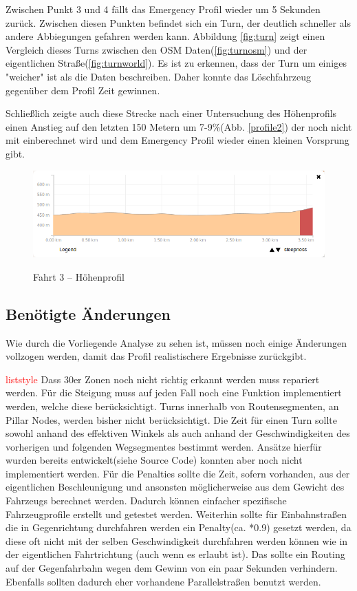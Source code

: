 \documentclass[12pt,a4paper]{article}
\newcommand\todo[1]{\textcolor{red}{#1}}
\begin{document}
Zwischen Punkt 3 und 4 fällt das Emergency Profil wieder um 5 Sekunden zurück. Zwischen diesen Punkten befindet sich ein Turn, der deutlich schneller als andere Abbiegungen gefahren werden kann. Abbildung \ref{fig:turn} zeigt einen Vergleich dieses Turns zwischen den OSM Daten(\ref{fig:turnosm}) und der eigentlichen Straße(\ref{fig:turnworld}). Es ist zu erkennen, dass der Turn um einiges "weicher" ist als die Daten beschreiben. Daher konnte das Löschfahrzeug gegenüber dem Profil Zeit gewinnen.

Schließlich zeigte auch diese Strecke nach einer Untersuchung des Höhenprofils einen Anstieg auf den letzten 150 Metern um 7-9\%(Abb. \ref{profile2}) der noch nicht mit einberechnet wird und dem Emergency Profil wieder einen kleinen Vorsprung gibt.

\begin{figure}[h]
\centering
\caption{Fahrt 3 -- Höhenprofil}
\label{fig:profile2}
\includegraphics[width = 0.60 \textwidth]{../media/Fahrt3_Profile.png} \\
\end{figure}


\subsection{Benötigte Änderungen}

Wie durch die Vorliegende Analyse zu sehen ist, müssen noch einige Änderungen vollzogen werden, damit das Profil realistischere Ergebnisse zurückgibt.\par
\todo{liststyle}
Dass 30er Zonen noch nicht richtig erkannt werden muss repariert werden.
Für die Steigung muss auf jeden Fall noch eine Funktion implementiert werden, welche diese berücksichtigt.
Turns innerhalb von Routensegmenten, an Pillar Nodes, werden bisher nicht berücksichtigt.
Die Zeit für einen Turn sollte sowohl anhand des effektiven Winkels als auch anhand der Geschwindigkeiten des vorherigen und folgenden Wegsegmentes bestimmt werden. Ansätze hierfür wurden bereits entwickelt(siehe Source Code) konnten aber noch nicht implementiert werden.
Für die Penalties sollte die Zeit, sofern vorhanden, aus der eigentlichen Beschleunigung und ansonsten möglicherweise aus dem Gewicht des Fahrzeugs berechnet werden. Dadurch können einfacher spezifische Fahrzeugprofile erstellt und getestet werden.
Weiterhin sollte für Einbahnstraßen die in Gegenrichtung durchfahren werden ein Penalty(ca. *0.9) gesetzt werden, da diese oft nicht mit der selben Geschwindigkeit durchfahren werden können wie in der eigentlichen Fahrtrichtung (auch wenn es erlaubt ist). Das sollte ein Routing auf der Gegenfahrbahn wegen dem Gewinn von ein paar Sekunden verhindern. Ebenfalls sollten dadurch eher vorhandene Parallelstraßen benutzt werden.
\end{document}
